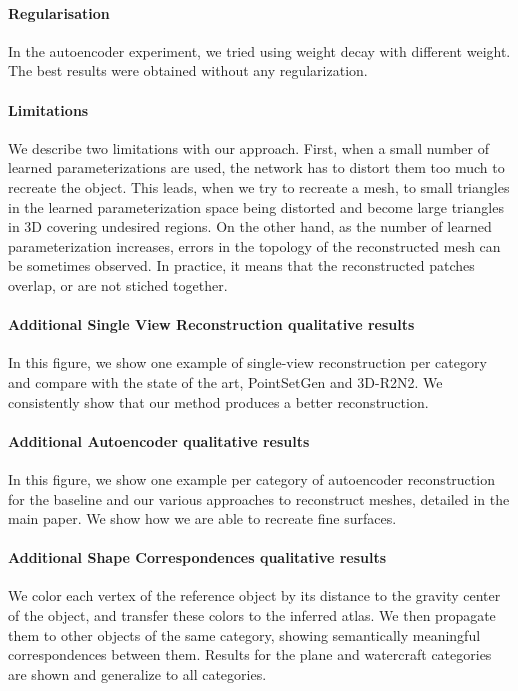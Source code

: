 \documentclass[10pt,twocolumn,letterpaper]{article}
\begin{document}
\paragraph{Regularisation} In  the  autoencoder experiment, we tried using weight decay with different weight. The best results were obtained without any regularization.
\vspace*{-2pt}

\paragraph{Limitations} We describe two limitations with our approach. First, when a small number of learned parameterizations are used, the network has to distort them too much to recreate the object. This leads, when we try to recreate a mesh, to small triangles in the learned parameterization space being distorted and become large triangles in 3D covering undesired regions. On the other hand, as the number of  learned parameterization increases, errors in the topology of the reconstructed mesh can be sometimes observed. 
In practice, it means that the reconstructed patches overlap, or are not stiched together.
\vspace*{-2pt}

\paragraph{Additional Single View Reconstruction qualitative results} In this figure, we show one example of single-view reconstruction per category and compare with the state of the art, PointSetGen and 3D-R2N2. We consistently show that our method produces a better reconstruction.
\vspace*{-2pt}

\paragraph{Additional Autoencoder qualitative results}
In this figure, we show one example per category of autoencoder reconstruction for the baseline and our various approaches to reconstruct meshes, detailed in the main paper. We show how we are able to recreate fine surfaces.
\vspace*{-2pt}

\paragraph{Additional Shape Correspondences qualitative results} We color each vertex of the reference object by its distance to the gravity center of the object, and transfer these colors to the inferred atlas. We then propagate them to other objects of the same category, showing semantically meaningful correspondences between them. Results for the plane and watercraft categories are shown and generalize to all categories.
\end{document}
